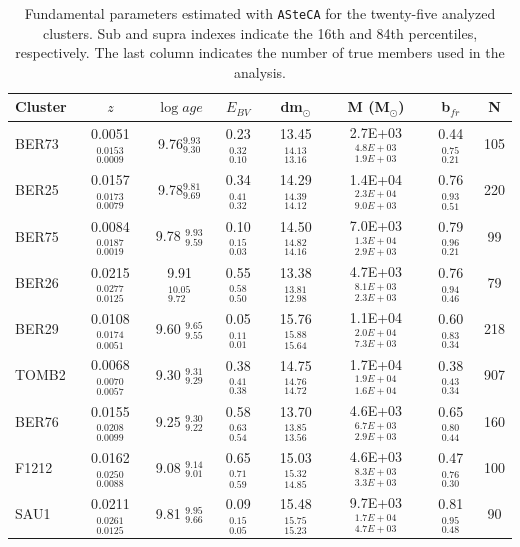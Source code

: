 \documentclass[draft]{aa}
\begin{document}
  \begin{table}
  \caption{Fundamental parameters estimated with \texttt{ASteCA} for the
  twenty-five analyzed clusters. Sub and supra indexes indicate the 16th
  and 84th percentiles, respectively. The last column indicates the number of
  true members used in the analysis.}
  \label{tab:results}
  \centering
  \begin{tabular}{lccccccc}
  \hline\hline
  Cluster & $z$ & $\log{age}$ & $E_{BV}$ & dm$_{\odot}$ & M (M$_{\odot}$) & b$_
  {fr}$ & N\\
  \hline %
  BER73 & 0.0051$_{0.0009}^{0.0153}$ & 9.76$_{9.30}^{9.93}$ & 0.23$_{0.10}^{0.32}$ &
  13.45$_{13.16}^{14.13}$ & 2.7E+03$_{1.9E+03}^{4.8E+03}$ & 0.44$_{0.21}^{0.75}$
  & 105\\[.2cm]
  BER25 &  0.0157$_{0.0079}^{0.0173}$ & 9.78$_{9.69}^{9.81}$ & 0.34$_{0.32}^{0.41}$ &
  14.29$_{14.12}^{14.39}$ & 1.4E+04$_{9.0E+03}^{2.3E+04}$ & 0.76$_{0.51}^{0.93}$
  & 220 \\[.2cm]
  BER75 & 0.0084$_{0.0019}^{0.0187}$ & 9.78 $_{9.59}^{9.93 }$ & 0.10$_{0.03}^{0.15}$ &
  14.50$_{14.16}^{14.82}$ & 7.0E+03$_{2.9E+03}^{1.3E+04}$ & 0.79$_{0.21}^{0.96}$ &
  99 \\[.2cm]
  BER26 & 0.0215$_{0.0125}^{0.0277}$ & 9.91 $_{9.72}^{10.05}$ & 0.55$_{0.50}^{0.58}$ &
  13.38$_{12.98}^{13.81}$ & 4.7E+03$_{2.3E+03}^{8.1E+03}$ & 0.76$_{0.46}^{0.94}$ &
  79 \\[.2cm]
  BER29 & 0.0108$_{0.0051}^{0.0174}$ & 9.60 $_{9.55}^{9.65 }$ & 0.05$_{0.01}^{0.11}$ &
  15.76$_{15.64}^{15.88}$ & 1.1E+04$_{7.3E+03}^{2.0E+04}$ & 0.60$_{0.34}^{0.83}$ &
  218 \\[.2cm]
  TOMB2 & 0.0068$_{0.0057}^{0.0070}$ & 9.30 $_{9.29}^{9.31 }$ & 0.38$_{0.38}^{0.41}$ &
  14.75$_{14.72}^{14.76}$ & 1.7E+04$_{1.6E+04}^{1.9E+04}$ & 0.38$_{0.34}^{0.43}$ &
  907 \\[.2cm]
  BER76 & 0.0155$_{0.0099}^{0.0208}$ & 9.25 $_{9.22}^{9.30 }$ & 0.58$_{0.54}^{0.63}$ &
  13.70$_{13.56}^{13.85}$ & 4.6E+03$_{2.9E+03}^{6.7E+03}$ & 0.65$_{0.44}^{0.80}$ &
  160 \\[.2cm]
  F1212 & 0.0162$_{0.0088}^{0.0250}$ & 9.08 $_{9.01}^{9.14 }$ & 0.65$_{0.59}^{0.71}$ &
  15.03$_{14.85}^{15.32}$ & 4.6E+03$_{3.3E+03}^{8.3E+03}$ & 0.47$_{0.30}^{0.76}$ &
  100 \\[.2cm]
  SAU1  & 0.0211$_{0.0125}^{0.0261}$ & 9.81 $_{9.66}^{9.95 }$ & 0.09$_{0.05}^{0.15}$ &
  15.48$_{15.23}^{15.75}$ & 9.7E+03$_{4.7E+03}^{1.7E+04}$ & 0.81$_{0.48}^{0.95}$ &
  90 \\[.2cm]

\end{tabular}
\end{table}
\end{document}
